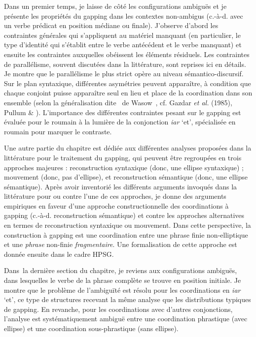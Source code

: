 Dans un premier temps, je laisse de côté les configurations ambiguës et je présente les propriétés du gapping dans les contextes non-ambigus (c.-à-d. avec un verbe prédicat en position médiane ou finale). J'observe d'abord les contraintes générales qui s'appliquent au matériel manquant (en particulier, le type d'identité qui s'établit entre le verbe antécédent et le verbe manquant) et ensuite les contraintes auxquelles obéissent les éléments résiduels. Les contraintes de parallélisme, souvent discutées dans la littérature, sont reprises ici en détails. Je montre que le parallélisme le plus strict opère au niveau sémantico-discursif. Sur le plan syntaxique, différentes asymétries peuvent apparaître, à condition que chaque conjoint puisse apparaître seul en lieu et place de la coordination dans son ensemble (selon la généralisation dite {\guillemotleft}~de Wasow~{\guillemotright}, cf. Gazdar \textit{et al.} (1985), Pullum \& \citet{Zwicky1986}). L'importance des différentes contraintes pesant sur le gapping est évaluée pour le roumain à la lumière de la conjonction \textit{iar} `et', spécialisée en roumain pour marquer le contraste.

Une autre partie du chapitre est dédiée aux différentes analyses proposées dans la littérature pour le traitement du gapping, qui peuvent être regroupées en trois approches majeures : reconstruction syntaxique (donc, une ellipse syntaxique) ; mouvement (donc, pas d'ellipse), et reconstruction sémantique (donc, une ellipse sémantique). Après avoir inventorié les différents arguments invoqués dans la littérature pour ou contre l'une de ces approches, je donne des arguments empiriques en faveur d'une approche constructionnelle des coordinations à gapping (c.-à-d. reconstruction sémantique) et contre les approches alternatives en termes de reconstruction syntaxique ou mouvement. Dans cette perspective, la construction à gapping est une coordination entre une phrase finie non-elliptique et une \textit{phrase} non-finie \textit{fragmentaire}. Une formalisation de cette approche est donnée ensuite dans le cadre HPSG. 

Dans~la dernière section du chapitre, je reviens aux configurations ambiguës, dans lesquelles le verbe de la phrase complète se trouve en position initiale. Je montre que le problème de l'ambiguïté est résolu pour les coordinations en \textit{iar} `et', ce type de structures recevant la même analyse que les distributions typiques de gapping. En revanche, pour les coordinations avec d'autres conjonctions, l'analyse est systématiquement ambiguë entre une coordination phrastique (avec ellipse) et une coordination sous-phrastique (sans ellipse).  

